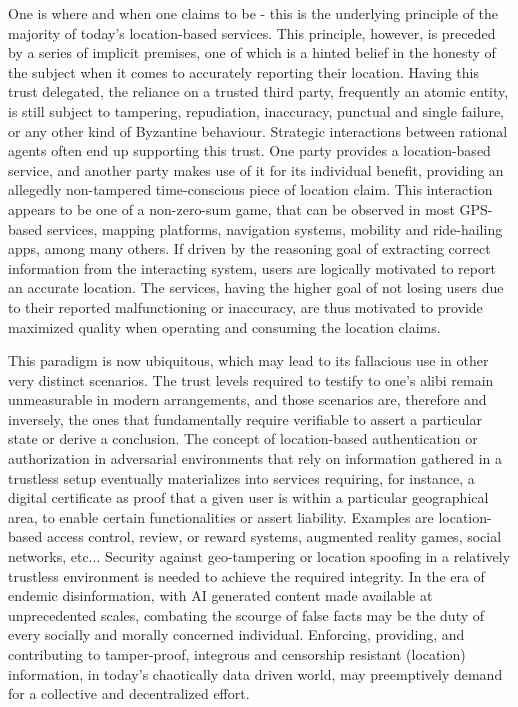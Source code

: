 
One is where and when one claims to be - this is the underlying principle of the majority of today's location-based services. This principle, however, is preceded by a series of implicit premises, one of which is a hinted belief in the honesty of the subject when it comes to accurately reporting their location. Having this trust delegated, the reliance on a trusted third party, frequently an atomic entity, is still subject to tampering, repudiation, inaccuracy, punctual and single failure, or any other kind of Byzantine behaviour. Strategic interactions between rational agents often end up supporting this trust. One party provides a location-based service, and another party makes use of it for its individual benefit, providing an allegedly non-tampered time-conscious piece of location claim. This interaction appears to be one of a non-zero-sum game, that can be observed in most GPS-based services, mapping platforms, navigation systems, mobility and ride-hailing apps, among many others. If driven by the reasoning goal of extracting correct information from the interacting system, users are logically motivated to report an accurate location. The services, having the higher goal of not losing users due to their reported malfunctioning or inaccuracy, are thus motivated to provide maximized quality when operating and consuming the location claims. 

This paradigm is now ubiquitous, which may lead to its fallacious use in other very distinct scenarios. The trust levels required to testify to one's alibi remain unmeasurable in modern arrangements, and those scenarios are, therefore and inversely, the ones that fundamentally require verifiable \pol to assert a particular state or derive a conclusion.  The concept of location-based authentication or authorization in adversarial environments that rely on information gathered in a trustless setup eventually materializes into services requiring, for instance, a digital certificate as proof that a given user is within a particular geographical area, to enable certain functionalities or assert liability. Examples are location-based access control, review, or reward systems, augmented reality games, social networks, etc... Security against geo-tampering or location spoofing in a relatively trustless environment is needed to achieve the required integrity. In the era of endemic disinformation, with AI generated content made available at unprecedented scales, combating the scourge of false facts may be the duty of every socially and morally concerned individual. Enforcing, providing, and contributing to tamper-proof, integrous and censorship resistant (location) information, in today's chaotically data driven world, may preemptively demand for a collective and decentralized effort. 

